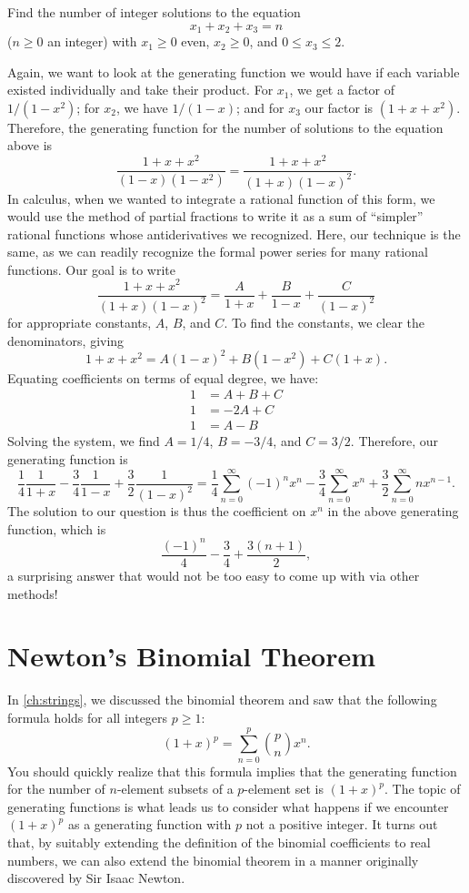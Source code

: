 \begin{example}
  Find the number of integer solutions to the equation
  \[x_1 + x_2 + x_3 = n\] ($n\geq 0$ an integer) with $x_1 \geq 0$
  even, $x_2\geq 0$, and $0\leq x_3\leq 2$.

  Again, we want to look at the generating function we would have if
  each variable existed individually and take their product. For
  $x_1$, we get a factor of $1/(1-x^2)$; for $x_2$, we have $1/(1-x)$;
  and for $x_3$ our factor is $(1+x+x^2)$. Therefore, the generating
  function for the number of solutions to the equation above is
  \[\frac{1+x+x^2}{(1-x)(1-x^2)} = \frac{1+x+x^2}{(1+x)(1-x)^2}.\]
  In calculus, when we wanted to integrate a rational function of this
  form, we would use the method of partial fractions to write it as a
  sum of ``simpler'' rational functions whose antiderivatives we
  recognized. Here, our technique is the same, as we can readily
  recognize the formal power series for many rational functions. Our
  goal is to write
  \[\frac{1+x+x^2}{(1+x)(1-x)^2} = \frac{A}{1+x} + \frac{B}{1-x} +
  \frac{C}{(1-x)^2}\]
  for appropriate constants, $A$, $B$, and $C$. To find the constants,
  we clear the denominators, giving
  \[1+x+x^2 = A(1-x)^2 + B(1-x^2) + C(1+x).\]
  Equating coefficients on terms of equal degree, we have:
  \begin{align*}
    1 &= A+B+C\\
    1 &= -2A + C\\
    1 &= A - B
  \end{align*}
  Solving the system, we find $A=1/4$, $B=-3/4$, and
  $C=3/2$. Therefore, our generating function is 
  \[\frac{1}{4}\frac{1}{1+x} -\frac{3}{4} \frac{1}{1-x} +\frac{3}{2}
  \frac{1}{(1-x)^2} = \frac{1}{4}\sum_{n=0}^\infty (-1)^n x^n -
  \frac{3}{4} \sum_{n=0}^\infty x^n + \frac{3}{2}\sum_{n=0}^\infty n
  x^{n-1}.\]
  The solution to our question is thus the coefficient on $x^n$ in the
  above generating function, which is
  \[\frac{(-1)^n}{4} - \frac{3}{4} + \frac{3(n+1)}{2},\]
  a surprising answer that would not be too easy to come up with via
  other methods!
\end{example}

\section{Newton's Binomial Theorem}\label{s:genfunction:gen-bin-thm}

In \autoref{ch:strings}, we discussed the binomial theorem and saw
that the following formula holds for all integers $p\ge1$:
\[
(1+x)^p =\sum_{n=0}^{p}\binom{p}{n} x^n.
\]
You should quickly realize that this formula implies that the
generating function for the number of $n$-element subsets of a
$p$-element set is $(1+x)^p$. The topic of generating functions is
what leads us to consider what happens if we encounter $(1+x)^p$ as a
generating function with $p$ not a positive integer. It turns out
that, by suitably extending the definition of the binomial
coefficients to real numbers, we can also extend the binomial theorem
in a manner originally discovered by Sir Isaac Newton.

